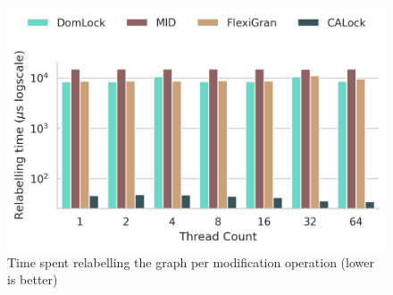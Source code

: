 

\begin{figure}[ht]
	\captionsetup{justification=centering}
	\centering
		\includegraphics[width=\columnwidth]{figures/PerformanceCharts/ReadWithModificationsRelabelling}
	\caption{Time spent relabelling the graph per modification operation (lower is better)}
	\label{relabellingTime}
\end{figure}

